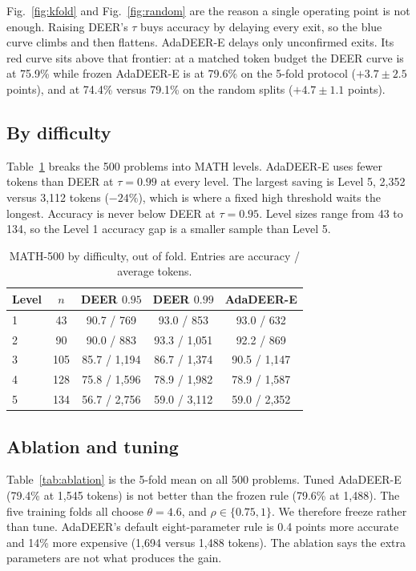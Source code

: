 \documentclass[conference]{IEEEtran}
\begin{document}
Fig.~\ref{fig:kfold} and Fig.~\ref{fig:random} are the reason a single operating point is not enough.
Raising DEER's $\tau$ buys accuracy by delaying every exit, so the blue curve climbs and then flattens.
AdaDEER-E delays only unconfirmed exits.
Its red curve sits above that frontier: at a matched token budget the DEER curve is at 75.9\% while frozen AdaDEER-E is at 79.6\% on the 5-fold protocol ($+3.7\pm 2.5$ points), and at 74.4\% versus 79.1\% on the random splits ($+4.7\pm 1.1$ points).

\subsection{By difficulty}
Table~\ref{tab:level} breaks the 500 problems into MATH levels.
AdaDEER-E uses fewer tokens than DEER at $\tau=0.99$ at every level.
The largest saving is Level 5, 2{,}352 versus 3{,}112 tokens ($-24\%$), which is where a fixed high threshold waits the longest.
Accuracy is never below DEER at $\tau=0.95$.
Level sizes range from 43 to 134, so the Level 1 accuracy gap is a smaller sample than Level 5.

\begin{table}[t]
\caption{MATH-500 by difficulty, out of fold. Entries are accuracy / average tokens.}
\label{tab:level}
\centering
\footnotesize
\begin{tabular}{@{}lcccc@{}}
\toprule
Level & $n$ & DEER $0.95$ & DEER $0.99$ & AdaDEER-E \\
\midrule
1 & 43 & 90.7 / 769 & 93.0 / 853 & 93.0 / 632 \\
2 & 90 & 90.0 / 883 & 93.3 / 1{,}051 & 92.2 / 869 \\
3 & 105 & 85.7 / 1{,}194 & 86.7 / 1{,}374 & 90.5 / 1{,}147 \\
4 & 128 & 75.8 / 1{,}596 & 78.9 / 1{,}982 & 78.9 / 1{,}587 \\
5 & 134 & 56.7 / 2{,}756 & 59.0 / 3{,}112 & 59.0 / 2{,}352 \\
\bottomrule
\end{tabular}
\end{table}

\subsection{Ablation and tuning}
Table~\ref{tab:ablation} is the 5-fold mean on all 500 problems.
Tuned AdaDEER-E (79.4\% at 1{,}545 tokens) is not better than the frozen rule (79.6\% at 1{,}488).
The five training folds all choose $\theta=4.6$, and $\rho\in\{0.75,1\}$.
We therefore freeze rather than tune.
AdaDEER's default eight-parameter rule is 0.4 points more accurate and 14\% more expensive (1{,}694 versus 1{,}488 tokens).
The ablation says the extra parameters are not what produces the gain.
\end{document}
